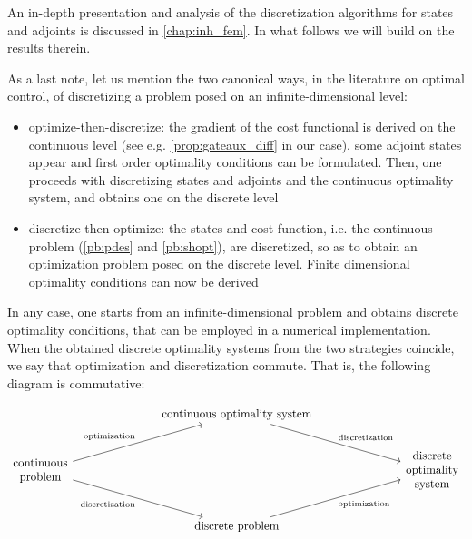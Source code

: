 \documentclass[english,a4paper,10pt,oneside]{scrbook}	%
\theoremstyle{break}
\theoremstyle{remark}
\begin{document}
An in-depth presentation and analysis of the discretization algorithms for states and adjoints is discussed in \cref{chap:inh_fem}. In what follows we will build on the results therein.

As a last note, let us mention the two canonical ways, in the literature on optimal control, of discretizing a problem posed on an infinite-dimensional level:

\begin{itemize}
	\item optimize-then-discretize: the gradient of the cost functional is derived on the continuous level (see e.g. \cref{prop:gateaux_diff} in our case), some adjoint states appear and first order optimality conditions can be formulated. Then, one proceeds with discretizing states and adjoints and the continuous optimality system, and obtains one on the discrete level
	\item discretize-then-optimize: the states and cost function, i.e. the continuous problem (\cref{pb:pdes} and \cref{pb:shopt}), are discretized, so as to obtain an optimization problem posed on the discrete level. Finite dimensional optimality conditions can now be derived
\end{itemize}

In any case, one starts from an infinite-dimensional problem and obtains discrete optimality conditions, that can be employed in a numerical implementation. When the obtained discrete optimality systems from the two strategies coincide, we say that optimization and discretization commute. That is, the following diagram is commutative:

\[\begin{tikzcd}
	&&& \text{continuous optimality system} \\
	\begin{matrix}
\text{continuous} \\ \text{problem}
\end{matrix} &&&&&& \begin{matrix}
\text{discrete} \\ \text{optimality} \\ \text{system}
\end{matrix}  \\
	&&& \text{discrete problem} 
	\arrow["{\text{optimization}}"', from=3-4, to=2-7]
	\arrow["{\text{discretization}}", from=1-4, to=2-7]
	\arrow["{\text{optimization}}", from=2-1, to=1-4]
	\arrow["{\text{discretization}}"', from=2-1, to=3-4]
\end{tikzcd}\]
\end{document}
